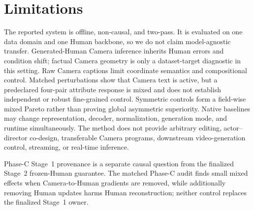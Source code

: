 \section{Limitations}

The reported system is offline, non-causal, and two-pass. It is evaluated on one data domain and
one Human backbone, so we do not claim model-agnostic transfer. Generated-Human Camera inference
inherits Human errors and condition shift; factual Camera geometry is only a dataset-target
diagnostic in this setting. Raw Camera captions limit coordinate semantics and compositional
control. Matched perturbations show that Camera text is active, but a predeclared four-pair
attribute response is mixed and does not establish independent or robust fine-grained control.
Symmetric controls form a field-wise mixed Pareto rather than proving global asymmetric
superiority. Native baselines may
change representation, decoder, normalization, generation mode, and runtime simultaneously.
The method does not provide arbitrary editing, actor--director co-design, transferable Camera
programs, downstream video-generation control, streaming, or real-time inference.

Phase-C Stage~1 provenance is a separate causal question from the finalized Stage~2 frozen-Human
guarantee. The matched Phase-C audit finds small mixed effects when Camera-to-Human gradients are
removed, while additionally removing Human updates harms Human reconstruction; neither control
replaces the finalized Stage~1 owner.
